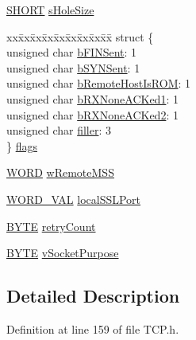 \begin{DoxyCompactItemize}
\begin{tabbing}
\end{tabbing}\item 
\hyperlink{_generic_type_defs_8h_ae9bb25d3afecf3bfab0fbe3c22c2050f}{S\+H\+O\+R\+T} \hyperlink{struct_t_c_b_a343884e48d9a59f81266a9e5cd1cb0b2}{s\+Hole\+Size}
\item 
\begin{tabbing}
xx\=xx\=xx\=xx\=xx\=xx\=xx\=xx\=xx\=\kill
struct \{\\
\>unsigned char \hyperlink{struct_t_c_b_ae7e84a3fa64de6e94ad093b762400e10}{bFINSent}: 1\\
\>unsigned char \hyperlink{struct_t_c_b_a5d60ed0da9975f201bdb5832564f24a2}{bSYNSent}: 1\\
\>unsigned char \hyperlink{struct_t_c_b_a85e50d5129c9eaec6e4729cb5aacf312}{bRemoteHostIsROM}: 1\\
\>unsigned char \hyperlink{struct_t_c_b_acd4766b3fc8c443d8aceb1920fc58677}{bRXNoneACKed1}: 1\\
\>unsigned char \hyperlink{struct_t_c_b_a22ffb6306d775b5180f9d9691240df08}{bRXNoneACKed2}: 1\\
\>unsigned char \hyperlink{struct_t_c_b_a3cc9af5814583d98e4724f5dfb86c5b8}{filler}: 3\\
\} \hyperlink{struct_t_c_b_adc44e41369b7d7bebc66a88b5a289e72}{flags}\\

\end{tabbing}\item 
\hyperlink{_generic_type_defs_8h_a2b0e863dadf920709ec53d9088ee7c91}{W\+O\+R\+D} \hyperlink{struct_t_c_b_a3a4e74a03e65f7f665046aaac3127228}{w\+Remote\+M\+S\+S}
\item 
\hyperlink{union_w_o_r_d___v_a_l}{W\+O\+R\+D\+\_\+\+V\+A\+L} \hyperlink{struct_t_c_b_a3bf31b0f800d38012b3d40e51af0ed80}{local\+S\+S\+L\+Port}
\item 
\hyperlink{_generic_type_defs_8h_a4ae1dab0fb4b072a66584546209e7d58}{B\+Y\+T\+E} \hyperlink{struct_t_c_b_a122f749211c26b45afbac25b4a278b56}{retry\+Count}
\item 
\hyperlink{_generic_type_defs_8h_a4ae1dab0fb4b072a66584546209e7d58}{B\+Y\+T\+E} \hyperlink{struct_t_c_b_a2c590b42dac0ddfc5ec2e193261815c5}{v\+Socket\+Purpose}
\end{DoxyCompactItemize}


\subsection{Detailed Description}


Definition at line 159 of file T\+C\+P.\+h.



